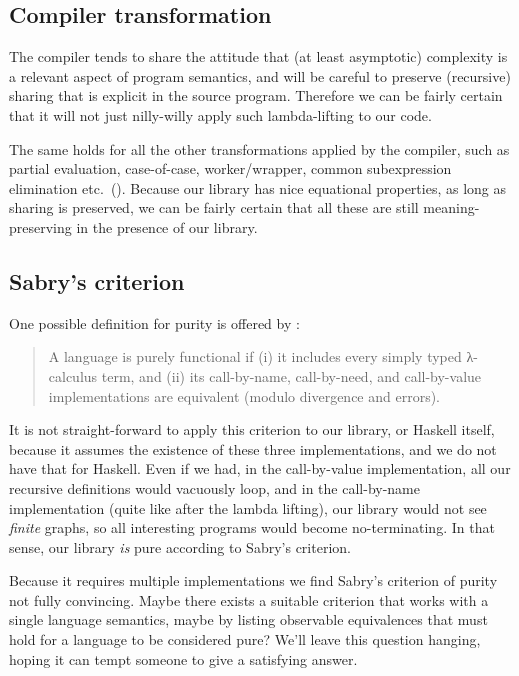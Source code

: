 \documentclass[manuscript,anonymous,screen,acmsmall]{acmart}
\begin{document}
\subsection{Compiler transformation}

The compiler tends to share the attitude that (at least asymptotic) complexity is a relevant aspect of program semantics, and will be careful to preserve (recursive) sharing that is explicit in the source program. Therefore we can be fairly certain that it will not just nilly-willy apply such lambda-lifting to our code.

The same holds for all the other transformations applied by the compiler, such as partial evaluation, case-of-case, worker/wrapper, common subexpression elimination etc.\ (\cite{optimiser}). Because our library has nice equational properties, as long as sharing is preserved, we can be fairly certain that all these are still meaning-preserving in the presence of our library.


\subsection{Sabry's criterion}

One possible definition for purity is offered by \citet{sabry}:
\begin{quote}
A language is purely functional if (i) it includes every simply typed λ-calculus term, and
(ii) its call-by-name, call-by-need, and call-by-value implementations are equivalent (modulo
divergence and errors).
\end{quote}

It is not straight-forward to apply this criterion to our library, or Haskell itself, because it assumes the existence of these three implementations, and we do not have that for Haskell. Even if we had, in the call-by-value implementation, all our recursive definitions would vacuously loop, and in the call-by-name implementation (quite like after the lambda lifting), our library would not see \emph{finite} graphs, so all interesting programs would become no-terminating. In that sense, our library \emph{is} pure according to Sabry’s criterion.

Because it requires multiple implementations we find Sabry’s criterion of purity not fully convincing. Maybe there exists a suitable criterion that works with a single language semantics, maybe by listing observable equivalences that must hold for a language to be considered pure?
We'll leave this question hanging, hoping it can tempt someone to give a satisfying answer.
\end{document}
